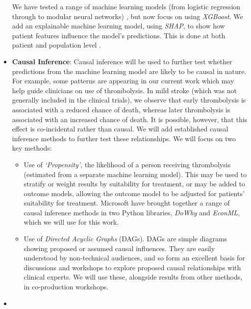 \begin{itemize}
\begin{itemize}
    \end{itemize}

    We have tested a range of machine learning models (from logistic regression through to modular neural networks) \cite{allen_using_2022}, but now focus on using \textit{XGBoost}. We add an explainable machine learning model, using \textit{SHAP}, to show how patient features influence the model's predictions. This is done at both patient and population level \cite{pearn_what_2023}.  

    \item \textbf{Causal Inference}: Causal inference will be used to further test whether predictions from the machine learning model are likely to be causal in nature. For example, some patterns are appearing in our current work which may help guide clinicians on use of thrombolysis. In mild stroke (which was not generally included in the clinical trials), we observe that early thrombolysis is associated with a reduced chance of death, whereas later thrombolysis is associated with an increased chance of death. It is possible, however, that this effect is co-incidental rather than causal. We will add established causal inference methods to further test these relationships. We will focus on two key methods:

    \begin{itemize}
        \item Use of \textit{`Propensity'}, the likelihood of a person receiving thrombolysis (estimated from a separate machine learning model). This may be used to stratify or weight results by suitability for treatment, or may be added to outcome models, allowing the outcome model to be adjusted for patients' suitability for treatment. Microsoft have brought together a range of causal inference methods in two Python libraries, \textit{DoWhy} and \textit{EconML}, which we will use for this work.

        \item Use of \textit{Directed Acyclic Graphs} (DAGs). DAGs are simple diagrams showing proposed or assumed causal influences. They are easily understood by non-technical audiences, and so form an excellent basis for discussions and workshops to explore proposed causal relationships with clinical experts. We will use these, alongside results from other methods, in co-production workshops.
    \end{itemize}

    \item 


\end{itemize}
